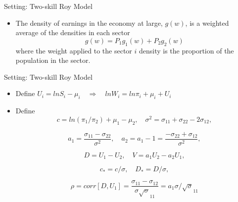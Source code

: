 \documentclass{beamer}
\begin{document}
\begin{frame}{Setting: Two-skill Roy Model}
	\begin{itemize}
	\item The density of earnings in the economy at large, $g(w)$, is a weighted average of the densities in each sector
	$$g(w)=P_1g_1(w)+P_2g_2(w)$$
	where the weight applied to the sector $i$ density is the proportion of the population in the sector.
	\end{itemize}
\end{frame}


\begin{frame}{Setting: Two-skill Roy Model}
	\begin{itemize}
		\item Define $U_i=lnS_i-\mu_i\quad\Rightarrow\quad lnW_i=ln\pi_i+\mu_i+U_i$

		\item Define
		$$c=ln(\pi_1/\pi_2)+\mu_1-\mu_2,\quad \sigma^2=\sigma_{11}+\sigma_{22}-2\sigma_{12},$$

		$$a_1=\frac{\sigma_{11}-\sigma_{22}}{\sigma^2}, \quad a_2=a_1-1=\frac{-\sigma_{22}+\sigma_{12}}{\sigma^2},$$

		$$D=U_1-U_2, \quad V=a_1U_2-a_2U_1,$$

		$$c_*=c/\sigma,\quad D_*=D/\sigma,$$

		$$\rho=corr[D,U_1]=\frac{\sigma_{11}-\sigma_{12}}{\sigma\sqrt\sigma_{11}}=a_1\sigma/\sqrt\sigma_{11}$$
	\end{itemize}
\end{frame}
\end{document}
